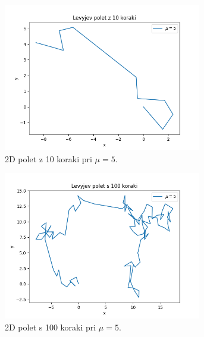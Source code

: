 \documentclass[a4paper, 12pt, slovene]{article}
\begin{document}
\begin{figure}[H]
\begin{subfigure}{0.49\textwidth}
	\centering
	\includegraphics[width=0.95\textwidth]{sprehodi/let-10-5.png}
	\caption{2D polet z 10 koraki pri $\mu = 5$.}
	\label{fig-let-10-5}
\end{subfigure}
\begin{subfigure}{0.49\textwidth}
	\centering
	\includegraphics[width=0.95\textwidth]{sprehodi/let-100-5.png}
	\caption{2D polet s 100 koraki pri $\mu = 5$.}
	\label{fig-let-100-5}
\end{subfigure}
\begin{subfigure}{0.49\textwidth}
	\centering

\end{subfigure}
\end{figure}
\end{document}
